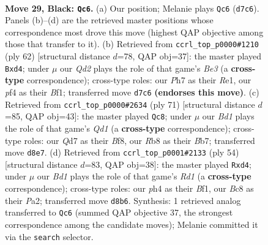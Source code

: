 \documentclass[11pt]{article}
\begin{document}
\clearpage

\begin{figure}[p]\centering
\begin{subfigure}{0.46\textwidth}\centering
\resizebox{\linewidth}{!}{%
\newchessgame
\chessboard[
  setfen={1rbb3k/pp1q3p/4BppB/8/5P1P/2QP1N2/PPP2PK1/4R3 b - - 2 29},
  showmover=false,
  pgfstyle=straightmove, color=movearrow, markmove={d7-c6}
]}
\caption{}
\end{subfigure}\hfill
\begin{subfigure}{0.46\textwidth}\centering
\resizebox{\linewidth}{!}{%
\newchessgame
\chessboard[
  setfen={r5k1/1p3pp1/3p1q1p/2n5/b1Pn4/4BP1P/P2Q2P1/4RB1K w - - 0 32},
  showmover=false,
  pgfstyle=straightmove, color=movearrow, markmove={e3-d4}
]}
\caption{}
\end{subfigure}
\\[4pt]
\begin{subfigure}{0.46\textwidth}\centering
\resizebox{\linewidth}{!}{%
\newchessgame
\chessboard[
  setfen={3q1bk1/1b3p2/p5p1/P2p3p/1p6/1N2PBP1/1P1Q1PP1/6K1 b - - 9 36},
  showmover=false,
  pgfstyle=straightmove, color=movearrow, markmove={d8-c8}
]}
\caption{}
\end{subfigure}\hfill
\begin{subfigure}{0.46\textwidth}\centering
\resizebox{\linewidth}{!}{%
\newchessgame
\chessboard[
  setfen={3rb1k1/pp3p1p/5qp1/3p4/1P1n4/1QP4P/P4PP1/3R1BK1 w - - 0 28},
  showmover=false,
  pgfstyle=straightmove, color=movearrow, markmove={d1-d4}
]}
\caption{}
\end{subfigure}
\caption{\textbf{Move 29, Black: \texttt{Qc6}.} (a) Our position; Melanie plays \texttt{Qc6} (\texttt{d7c6}). Panels (b)--(d) are the retrieved master positions whose correspondence most drove this move (highest QAP objective among those that transfer to it). (b) Retrieved from \texttt{ccrl\_top\_p0000\#1210} (ply 62) [structural distance $d$=78, QAP obj=37]: the master played \texttt{Bxd4}; under $\mu$ our \emph{Qd2} plays the role of that game's \emph{Be3} (a \textbf{cross-type} correspondence); cross-type roles: our \emph{P}h7 as their \emph{R}e1, our \emph{p}f4 as their \emph{B}f1; transferred move \texttt{d7c6} \textbf{(endorses this move)}. (c) Retrieved from \texttt{ccrl\_top\_p0000\#2634} (ply 71) [structural distance $d$=85, QAP obj=43]: the master played \texttt{Qc8}; under $\mu$ our \emph{Bd1} plays the role of that game's \emph{Qd1} (a \textbf{cross-type} correspondence); cross-type roles: our \emph{Q}d7 as their \emph{B}f8, our \emph{R}b8 as their \emph{B}b7; transferred move \texttt{d8e7}. (d) Retrieved from \texttt{ccrl\_top\_p0001\#2133} (ply 54) [structural distance $d$=83, QAP obj=38]: the master played \texttt{Rxd4}; under $\mu$ our \emph{Bd1} plays the role of that game's \emph{Rd1} (a \textbf{cross-type} correspondence); cross-type roles: our \emph{p}h4 as their \emph{B}f1, our \emph{B}c8 as their \emph{P}a2; transferred move \texttt{d8b6}. Synthesis: 1 retrieved analog transferred to \texttt{Qc6} (summed QAP objective 37, the strongest correspondence among the candidate moves); Melanie committed it via the \texttt{search} selector.}
\label{fig:thought-m57}
\end{figure}
\end{document}
